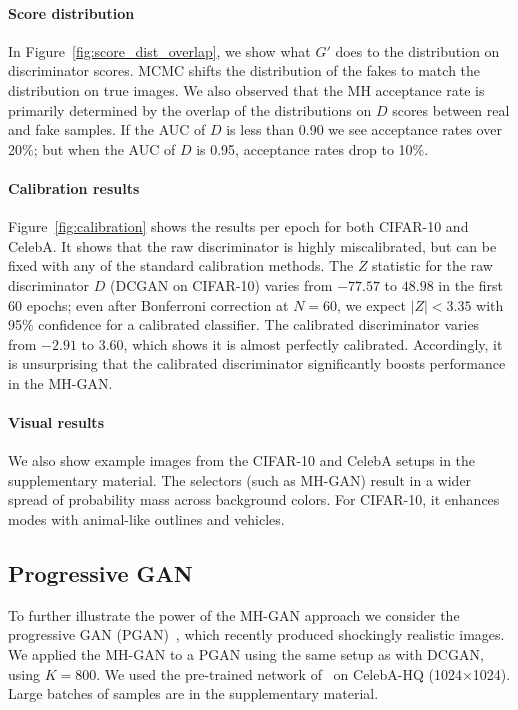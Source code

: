 \documentclass{article}
\begin{document}
\paragraph{Score distribution}
In Figure~\ref{fig:score_dist_overlap}, we show what $G'$ does to the distribution on discriminator scores.
MCMC shifts the distribution of the fakes to match the distribution on true images.
We also observed that the MH acceptance rate is primarily determined by the overlap of the distributions on $D$ scores between real and fake samples.
If the AUC of $D$ is less than 0.90 we see acceptance rates over 20\%; but when the AUC of $D$ is 0.95, acceptance rates drop to 10\%.

\paragraph{Calibration results}
Figure~\ref{fig:calibration} shows the results per epoch for both CIFAR-10 and CelebA\@.
It shows that the raw discriminator is highly miscalibrated, but can be fixed with any of the standard calibration methods.
The $Z$ statistic for the raw discriminator $D$ (DCGAN on CIFAR-10) varies from $-77.57$ to $48.98$ in the first 60 epochs; even after Bonferroni correction at $N \!\!=\!\! 60$, we expect $|Z| < 3.35$ with 95\% confidence for a calibrated classifier.
The calibrated discriminator varies from $-2.91$ to $3.60$, which shows it is almost perfectly calibrated.
Accordingly, it is unsurprising that the calibrated discriminator significantly boosts performance in the MH-GAN\@.

\paragraph{Visual results}
We also show example images from the CIFAR-10 and CelebA setups in the supplementary material.
The selectors (such as MH-GAN) result in a wider spread of probability mass across background colors.
For CIFAR-10, it enhances modes with animal-like outlines and vehicles.

\subsection{Progressive GAN}

To further illustrate the power of the MH-GAN approach we consider the progressive GAN (PGAN)~\citep{Karras2017}, which recently produced shockingly realistic images.
We applied the MH-GAN to a PGAN using the same setup as with DCGAN, using $K=800$.
We used the pre-trained network of~\citet{Karras2017} on CelebA-HQ (1024$\times$1024)\@.
Large batches of samples are in the supplementary material.
\end{document}
